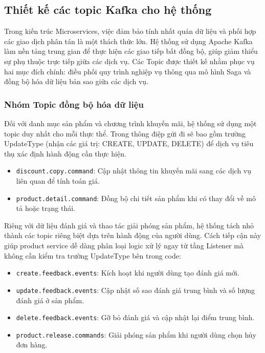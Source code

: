 \subsection{Thiết kế các topic Kafka cho hệ thống}

Trong kiến trúc Microservices, việc đảm bảo tính nhất quán dữ liệu và phối hợp các giao dịch phân tán là một thách thức lớn. Hệ thống sử dụng Apache Kafka làm nền tảng trung gian để thực hiện các giao tiếp bất đồng bộ, giúp giảm thiểu sự phụ thuộc trực tiếp giữa các dịch vụ. Các Topic được thiết kế nhằm phục vụ hai mục đích chính: điều phối quy trình nghiệp vụ thông qua mô hình Saga và đồng bộ hóa dữ liệu bản sao giữa các dịch vụ.

\subsubsection{Nhóm Topic đồng bộ hóa dữ liệu}

Đối với danh mục sản phẩm và chương trình khuyến mãi, hệ thống sử dụng một topic duy nhất cho mỗi thực thể. Trong thông điệp gửi đi sẽ bao gồm trường UpdateType (nhận các giá trị: CREATE, UPDATE, DELETE) để dịch vụ tiêu thụ xác định hành động cần thực hiện.

\begin{itemize}
\item \texttt{discount.copy.command}: Cập nhật thông tin khuyến mãi sang các dịch vụ liên quan để tính toán giá.
\item \texttt{product.detail.command}: Đồng bộ chi tiết sản phẩm khi có thay đổi về mô tả hoặc trạng thái.
\end{itemize}

Riêng với dữ liệu đánh giá và thao tác giải phóng sản phẩm, hệ thống tách nhỏ thành các topic riêng biệt dựa trên hành động của người dùng. Cách tiếp cận này giúp product service dễ dàng phân loại logic xử lý ngay từ tầng Listener mà không cần kiểm tra trường UpdateType bên trong code:

\begin{itemize}
    \item \texttt{create.feedback.events}: Kích hoạt khi người dùng tạo đánh giá mới.
    \item \texttt{update.feedback.events}: Cập nhật số sao đánh giá trung bình và số lượng đánh giá ở sản phẩm.
    \item \texttt{delete.feedback.events}: Gỡ bỏ đánh giá và cập nhật lại điểm trung bình.
    \item \texttt{product.release.commands}: Giải phóng sản phẩm khi người dùng chọn hủy đơn hàng.
\end{itemize}

